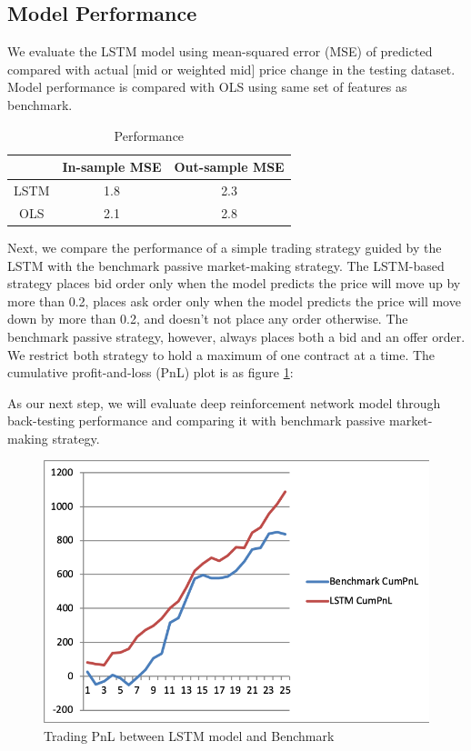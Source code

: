 \documentclass{article}
\begin{document}
\subsection{Model Performance}

We evaluate the LSTM model using mean-squared error (MSE) of predicted compared with actual [mid or weighted mid] price change in the testing dataset. Model performance is compared with OLS using same set of features as benchmark.

\begin{table}
\begin{center}
\begin{tabular}{ | c | c | c | } 
\hline
& In-sample MSE & Out-sample MSE \\ 
\hline
LSTM &  1.8 & 2.3 \\ 
\hline
OLS & 2.1 & 2.8 \\ 
\hline
\end{tabular}
\end{center}
\caption{Performance} \label{tab:perf}
\end{table}

Next, we compare the performance of a simple trading strategy guided by the LSTM with the benchmark passive market-making strategy. The LSTM-based strategy places bid order only when the model predicts the price will move up by more than 0.2, places ask order only when the model predicts the price will move down by more than 0.2, and doesn’t not place any order otherwise. The benchmark passive strategy, however, always places both a bid and an offer order. We restrict both strategy to hold a maximum of one contract at a time. The cumulative profit-and-loss (PnL) plot is as figure \ref{fig:lstm_pnl}:

As our next step, we will evaluate deep reinforcement network model through back-testing performance and comparing it with benchmark passive market-making strategy.

\begin{figure}
  \includegraphics[width=\linewidth]{lstm_pnl.png}
  \caption{Trading PnL between LSTM model and Benchmark}
  \label{fig:lstm_pnl}
\end{figure}
\end{document}
